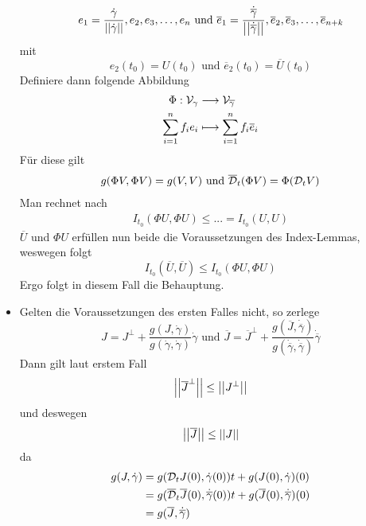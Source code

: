 \documentclass{book}
\renewcommand{\l}[1]{\overline{#1}}
\begin{document}
\begin{Beweis}{}
\begin{itemize}
\begin{align*}
e_1 = \frac{\dot{\gamma}}{\norm{\dot{\gamma}}}, e_2, e_3, \ldots, e_{n} \text{ und } \l e_1 = \frac{\dot{\l\gamma}}{\norm{\dot{\l\gamma}}}, \l e_2 , \l e_3,\ldots, \l e_{n+k}
\end{align*}
mit
\[ e_2(t_0) = U(t_0) \text{ und } \l e_2(t_0) = \l U (t_0) \]
Definiere dann folgende Abbildung
\begin{align*}
\Phi : \V_\gamma &\Pfeil{} \V_{\l \gamma}\\
\sum_{i = 1}^{n} f_i e_i &\longmapsto \sum_{i = 1}^{n} f_i \l e_i
\end{align*}
Für diese gilt
\begin{align*}
g(\Phi V, \Phi V) = g(V,V) \text{ und } \l \D_t(\Phi V) = \Phi (\D_t V)
\end{align*}
Man rechnet nach
\begin{align*}
I_{t_0}(\Phi U, \Phi U) \leq ... = I_{t_0}(U, U)
\end{align*}
$\l U$ und $\Phi U$ erfüllen nun beide die Voraussetzungen des Index-Lemmas, weswegen folgt
\[ I_{t_0}(\l U, \l U) \leq I_{t_0} ( \Phi U, \Phi U) \]
Ergo folgt in diesem Fall die Behauptung.
\item Gelten die Voraussetzungen des ersten Falles nicht, so zerlege
\[ J = J^\bot + \frac{g(J,\dot{\gamma})}{g(\dot{\gamma},\dot{\gamma})} \dot{\gamma} \text{ und } 
 \l J = \l{J}^\bot + \frac{g(\l J,\dot{\l\gamma})}{g(\dot{\l\gamma},\dot{\l\gamma})} \dot{\l\gamma}\] 
Dann gilt laut erstem Fall
\[ \norm{\l{ J}^\bot} \leq \norm{J^\bot} \]
und deswegen
\[ \norm{\l{ J}} \leq \norm{J} \]
da 
\begin{align*}
g(J, \dot{\gamma}) &= g(\D_t J(0), \dot{\gamma}(0))t + g(J(0), \dot{\gamma})(0)\\
&= g(\l\D_t \l J(0), \dot{\l\gamma}(0))t + g(\l J(0), \dot{\l\gamma})(0)\\
&= g(\l J, \dot{\l \gamma})
\end{align*}
\end{itemize}
\end{Beweis}
\end{document}

